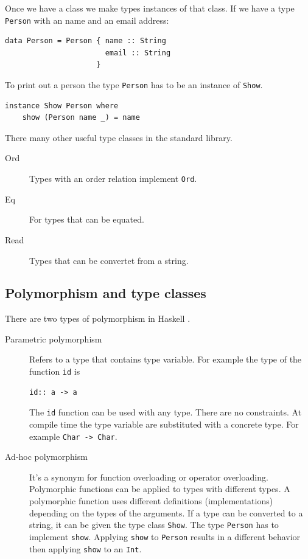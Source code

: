 \documentclass[twoside, a4paper, 12pt]{article}
\begin{document}
Once we have a class we make types instances of that class. If we have a type \verb|Person| with an name and an email address:
\begin{verbatim}
data Person = Person { name :: String
                       email :: String
                     }
\end{verbatim}

To print out a person the type \verb|Person| has to be an instance of \verb|Show|.

\begin{verbatim}
instance Show Person where
    show (Person name _) = name
\end{verbatim}

There many other useful type classes in the standard library.

\begin{description}
\item[Ord] Types with an order relation implement \verb|Ord|.
\item[Eq] For types that can be equated.
\item[Read] Types that can be convertet from a string.
\end{description}

\subsection{Polymorphism and type classes}
\label{sec:polymorphism}

There are two types of polymorphism in Haskell \cite{Cardelli}.
\begin{description}
\item[Parametric polymorphism] Refers to a type that contains type variable. For example the type of the function \verb|id| is 
\begin{verbatim}
id:: a -> a
\end{verbatim}
The \verb|id| function can be used with any type. There are no constraints. At compile time the type variable are substituted with a concrete type. For example
\verb|Char -> Char|.
\item[Ad-hoc polymorphism] It's a synonym for function overloading or operator overloading. Polymorphic functions can be applied to types with different types. A polymorphic function uses different definitions (implementations) depending on the types of the arguments. If a type can be converted to a string, it can be given the type class \verb|Show|. The type \verb|Person| has to implement \verb|show|. Applying \verb|show| to \verb|Person| results in a different behavior then applying \verb|show| to an \verb|Int|.
\end{description}
\end{document}
